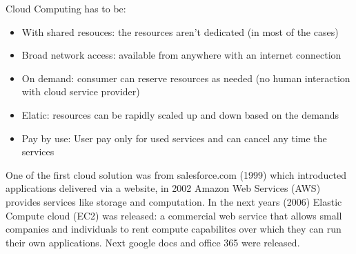 Cloud Computing has to be:
\begin{itemize}
    \item With shared resouces: the resources aren't dedicated (in most of the cases)
    \item Broad network access: available from anywhere with an internet connection
    \item On demand: consumer can reserve resources as needed (no human interaction with cloud service provider)
    \item Elatic: resources can be rapidly scaled up and down based on the demands
    \item Pay by use: User pay only for used services and can cancel any time the services
\end{itemize}
One of the first cloud solution was from salesforce.com (1999) which introducted applications delivered via a website, in 2002 Amazon Web Services (AWS) provides services like storage and computation. In the next years (2006) Elastic Compute cloud (EC2) was released: a commercial web service that allows small companies and individuals to rent compute capabilites over which they can run their own applications. Next google docs and office 365 were released.

